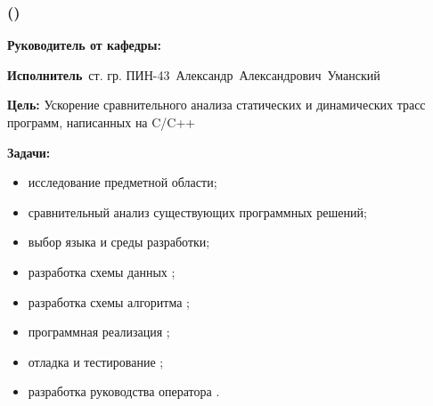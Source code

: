 \begin{frame}
    \frametitle{\textbf{\thesisTitle} ({\ProgModule})}
\textbf{Руководитель от кафедры:}~\supervisorRegaliaShort~\supervisorFioShort

\textbf{Исполнитель}~ст. гр. ПИН-43~Александр~Александрович~Уманский

\textbf{Цель:} Ускорение сравнительного анализа статических и динамических трасс программ, написанных на C/C++

\textbf{Задачи:}
\begin{itemize}
    \item исследование предметной области;
    \item сравнительный анализ существующих программных решений;
    \item выбор языка и среды разработки;
    \item разработка схемы данных {\ProgModule};
    \item разработка схемы алгоритма {\ProgModule};
    \item программная реализация {\ProgModule};
    \item отладка и тестирование {\ProgModule};
    \item разработка руководства оператора {\ProgModule}.
\end{itemize}
\end{frame}
